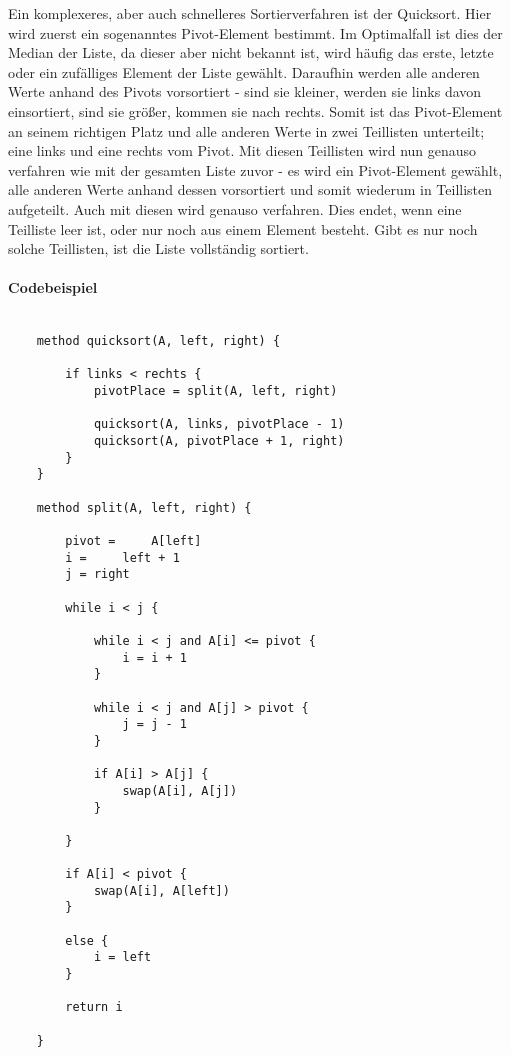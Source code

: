 \documentclass{article}
\begin{document}
	Ein komplexeres, aber auch schnelleres Sortierverfahren ist der Quicksort. Hier wird zuerst ein sogenanntes Pivot-Element bestimmt. Im Optimalfall ist dies der Median der Liste, da dieser aber nicht bekannt ist, wird häufig das erste, letzte oder ein zufälliges Element der Liste gewählt. Daraufhin werden alle anderen Werte anhand des Pivots vorsortiert - sind sie kleiner, werden sie links davon einsortiert, sind sie größer, kommen sie nach rechts. Somit ist das Pivot-Element an seinem richtigen Platz und alle anderen Werte in zwei Teillisten unterteilt; eine links und eine rechts vom Pivot. Mit diesen Teillisten wird nun genauso verfahren wie mit der gesamten Liste zuvor - es wird ein Pivot-Element gewählt, alle anderen Werte anhand dessen vorsortiert und somit wiederum in Teillisten aufgeteilt. Auch mit diesen wird genauso verfahren. Dies endet, wenn eine Teilliste leer ist, oder nur noch aus einem Element besteht. Gibt es nur noch solche Teillisten, ist die Liste vollständig sortiert. 
	
	\paragraph{Codebeispiel}
	\begin{lstlisting}[caption=Der Quicksort-Algorithmus in einfachem Pseudocode]
	
	method quicksort(A, left, right) {
	
		if links < rechts {
			pivotPlace = split(A, left, right)
			
			quicksort(A, links, pivotPlace - 1)
			quicksort(A, pivotPlace + 1, right)
		}
	}
	
	method split(A, left, right) {
		
		pivot = 	A[left]
		i = 	left + 1
		j = right
		
		while i < j {
			
			while i < j and A[i] <= pivot {
				i = i + 1
			}
			
			while i < j and A[j] > pivot {
				j = j - 1
			}
			
			if A[i] > A[j] {
				swap(A[i], A[j])			
			}
					
		}
		
		if A[i] < pivot {
			swap(A[i], A[left])
		}
		
		else {
			i = left		
		}
		
		return i
		
	}
	
	\end{lstlisting}
	
\end{document}
